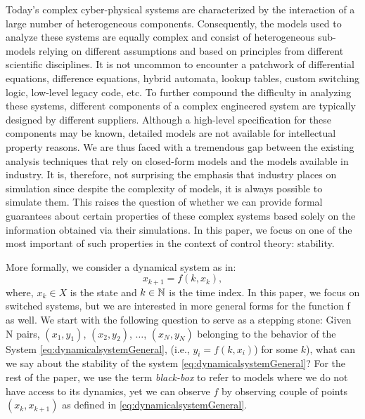 Today's complex cyber-physical systems are characterized by the interaction of a large number of heterogeneous components. Consequently, the models used to analyze these systems are equally complex and consist of heterogeneous sub-models relying on different assumptions and based on principles from different scientific disciplines. It is not uncommon to encounter a patchwork of differential equations, difference equations, hybrid automata, lookup tables, custom switching logic, low-level legacy code, etc. To further compound the difficulty in analyzing these systems, different components of a complex engineered system are typically designed by different suppliers. Although a high-level specification for these components may be known, detailed models are not available for intellectual property reasons. We are thus faced with a tremendous gap between the existing analysis techniques that rely on closed-form models and the models available in industry. It is, therefore, not surprising the emphasis that industry places on simulation since despite the complexity of models, it is always possible to simulate them. This raises the question of whether we can provide formal guarantees about certain properties of these complex systems based solely on the information obtained via their simulations. In this paper, we focus on one of the most important of such properties in the context of control theory: stability.

More formally, we consider a dynamical system as in:
\begin{equation}\label{eq:dynamicalsystemGeneral}x_{k+1} = f(k, x_k),
\end{equation}
where, $x_k \in X$ is the state and $k \in \mathbb{N}$ is the time index. In this paper, we focus on switched systems, but we are interested in more general forms for the function f as well.
We start with the following question to serve as a stepping stone: Given N pairs, $(x_1, y_1)$, $(x_2, y_2)$, $\ldots$, $(x_N, y_N)$ belonging to the behavior of the System \eqref{eq:dynamicalsystemGeneral}, (i.e., $y_{i} = f(k, x_i)$) for some $k$), what can we say about the stability of the system \eqref{eq:dynamicalsystemGeneral}? For the rest of the paper, we use the term \emph{black-box} to refer to models where we do not have access to its dynamics, yet we can observe $f$ by observing couple of points $(x_k, x_{k+1})$ as defined in \eqref{eq:dynamicalsystemGeneral}.

